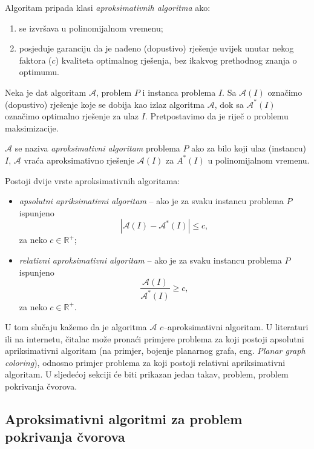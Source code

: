 \documentclass[a4paper, utf8, 11pt, colorlinks]{book}
\theoremstyle{definition}
\begin{document}
  \noindent Algoritam pripada klasi \emph{aproksimativnih algoritma} ako:
  \begin{enumerate}
  	\item se izvršava u polinomijalnom vremenu;
  	\item posjeduje garanciju da je nađeno (dopustivo) rješenje uvijek unutar nekog faktora ($c$) kvaliteta optimalnog rješenja, bez ikakvog prethodnog znanja o optimumu.
  \end{enumerate}
  Neka je dat algoritam $\mathcal{A}$, problem $P$ i instanca problema $I$. Sa $\mathcal{A}(I)$ označimo (dopustivo) rješenje koje se dobija kao izlaz algoritma $\mathcal{A}$, dok sa $\mathcal{A}^*(I)$ označimo optimalno rješenje za ulaz $I$. Pretpostavimo da je riječ o problemu maksimizacije. 
  
  $\mathcal{A}$ se naziva \emph{aproksimativni algoritam} problema $P$ ako 
  za bilo koji ulaz (instancu) $I$, $\mathcal{A}$ vraća aproksimativno rješenje $\mathcal{A}(I)$ za $A^*(I)$ u polinomijalnom vremenu. 
  
  Postoji dvije vrste aproksimativnih algoritama:
  \begin{itemize}
  	\item \emph{apsolutni apriksimativni algoritam} -- ako je za svaku instancu problema $P$ ispunjeno
  	$$ |\mathcal{A}(I) - \mathcal{A}^*(I)| \leq c,$$ za neko $c\in \mathbb{R}^+$;
  	\item \emph{relativni aproksimativni algoritam} -- ako je   za svaku instancu problema $P$ ispunjeno
  	$$\frac{\mathcal{A}(I)}{\mathcal{A}^*(I)} \geq c,$$ za neko $c\in \mathbb{R}^+$.
  \end{itemize}
  
  \noindent U tom slučaju kažemo da je algoritma $\mathcal{A}$ $c$--aproksimativni algoritam. U literaturi ili na internetu, čitalac može pronaći primjere problema za koji postoji apsolutni apriksimativni algoritam (na primjer, bojenje planarnog grafa, eng. \emph{Planar graph coloring}), odnosno primjer problema za koji postoji relativni apriksimativni algoritam. U sljedećoj sekciji će biti prikazan jedan takav, problem,  problem pokrivanja čvorova. 
  
  \subsection{Aproksimativni algoritmi za problem pokrivanja čvorova}
  
\end{document}
